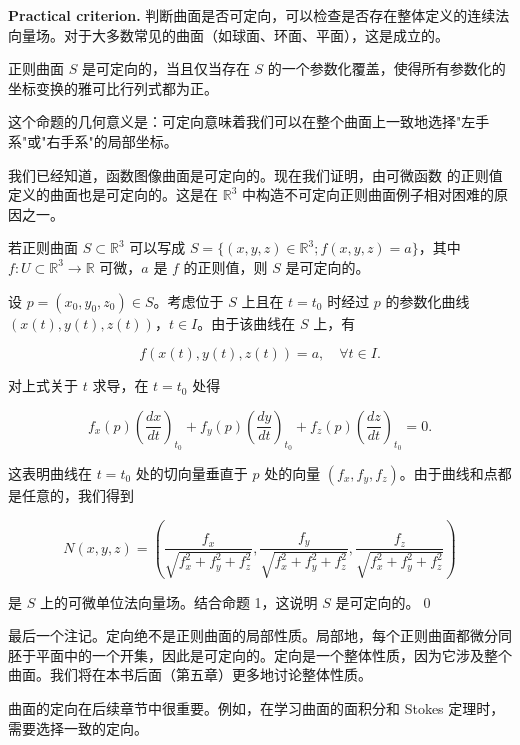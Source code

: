\textbf{Practical criterion.} 判断曲面是否可定向，可以检查是否存在整体定义的连续法向量场。对于大多数常见的曲面（如球面、环面、平面），这是成立的。

\begin{Proposition}[可定向的等价条件]\label{prop:orientable-equivalent}
正则曲面 $S$ 是可定向的，当且仅当存在 $S$ 的一个参数化覆盖，使得所有参数化的坐标变换的雅可比行列式都为正。
\end{Proposition}

这个命题的几何意义是：可定向意味着我们可以在整个曲面上一致地选择"左手系"或"右手系"的局部坐标。

我们已经知道，函数图像曲面是可定向的。现在我们证明，由可微函数 的正则值定义的曲面也是可定向的。这是在 $\mathbb{R}^3$ 中构造不可定向正则曲面例子相对困难的原因之一。

\begin{Proposition}[正则值定义的曲面可定向]\label{prop:regular-value-orientable}
若正则曲面 $S \subset \mathbb{R}^3$ 可以写成 $S = \{(x,y,z) \in \mathbb{R}^3; f(x,y,z) = a\}$，其中 $f: U \subset \mathbb{R}^3 \to \mathbb{R}$ 可微，$a$ 是 $f$ 的正则值，则 $S$ 是可定向的。
\end{Proposition}

\begin{Proof}
设 $p = (x_0, y_0, z_0) \in S$。考虑位于 $S$ 上且在 $t = t_0$ 时经过 $p$ 的参数化曲线 $(x(t), y(t), z(t))$，$t \in I$。由于该曲线在 $S$ 上，有

\[
f(x(t), y(t), z(t)) = a, \quad \forall t \in I.
\]

对上式关于 $t$ 求导，在 $t = t_0$ 处得

\[
f_x(p) \left(\frac{dx}{dt}\right)_{t_0} + f_y(p) \left(\frac{dy}{dt}\right)_{t_0} + f_z(p) \left(\frac{dz}{dt}\right)_{t_0} = 0.
\]

这表明曲线在 $t = t_0$ 处的切向量垂直于 $p$ 处的向量 $(f_x, f_y, f_z)$。由于曲线和点都是任意的，我们得到

\[
N(x, y, z) = \left(\frac{f_x}{\sqrt{f_x^2 + f_y^2 + f_z^2}}, \frac{f_y}{\sqrt{f_x^2 + f_y^2 + f_z^2}}, \frac{f_z}{\sqrt{f_x^2 + f_y^2 + f_z^2}}\right)
\]

是 $S$ 上的可微单位法向量场。结合命题 1，这说明 $S$ 是可定向的。\qed
\end{Proof}

最后一个注记。定向绝不是正则曲面的局部性质。局部地，每个正则曲面都微分同胚于平面中的一个开集，因此是可定向的。定向是一个整体性质，因为它涉及整个曲面。我们将在本书后面（第五章）更多地讨论整体性质。

\begin{Remark}
曲面的定向在后续章节中很重要。例如，在学习曲面的面积分和 Stokes 定理时，需要选择一致的定向。
\end{Remark}

